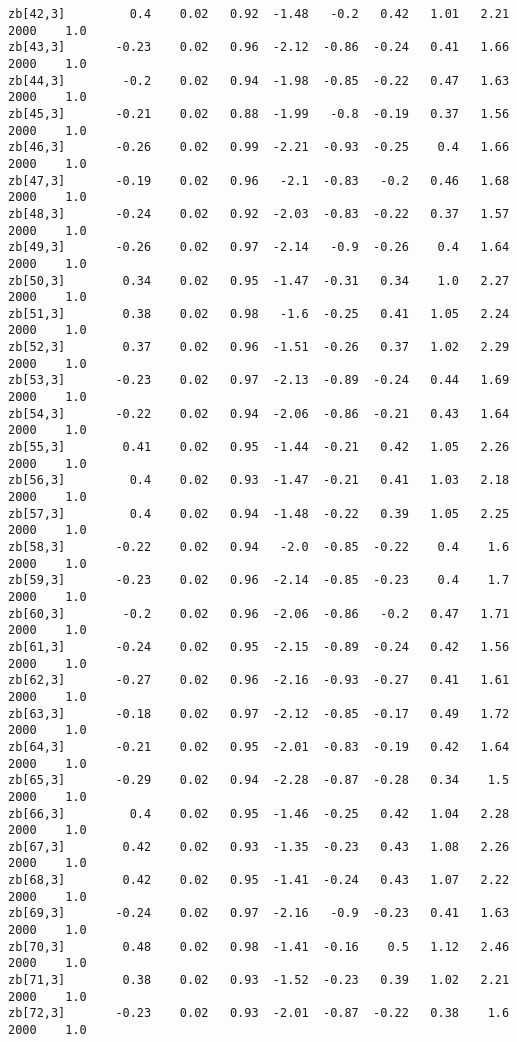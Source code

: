 \documentclass[11pt]{article}
\begin{document}
\begin{Verbatim}[commandchars=\\\{\}]
zb[42,3]         0.4    0.02   0.92  -1.48   -0.2   0.42   1.01   2.21   2000    1.0
zb[43,3]       -0.23    0.02   0.96  -2.12  -0.86  -0.24   0.41   1.66   2000    1.0
zb[44,3]        -0.2    0.02   0.94  -1.98  -0.85  -0.22   0.47   1.63   2000    1.0
zb[45,3]       -0.21    0.02   0.88  -1.99   -0.8  -0.19   0.37   1.56   2000    1.0
zb[46,3]       -0.26    0.02   0.99  -2.21  -0.93  -0.25    0.4   1.66   2000    1.0
zb[47,3]       -0.19    0.02   0.96   -2.1  -0.83   -0.2   0.46   1.68   2000    1.0
zb[48,3]       -0.24    0.02   0.92  -2.03  -0.83  -0.22   0.37   1.57   2000    1.0
zb[49,3]       -0.26    0.02   0.97  -2.14   -0.9  -0.26    0.4   1.64   2000    1.0
zb[50,3]        0.34    0.02   0.95  -1.47  -0.31   0.34    1.0   2.27   2000    1.0
zb[51,3]        0.38    0.02   0.98   -1.6  -0.25   0.41   1.05   2.24   2000    1.0
zb[52,3]        0.37    0.02   0.96  -1.51  -0.26   0.37   1.02   2.29   2000    1.0
zb[53,3]       -0.23    0.02   0.97  -2.13  -0.89  -0.24   0.44   1.69   2000    1.0
zb[54,3]       -0.22    0.02   0.94  -2.06  -0.86  -0.21   0.43   1.64   2000    1.0
zb[55,3]        0.41    0.02   0.95  -1.44  -0.21   0.42   1.05   2.26   2000    1.0
zb[56,3]         0.4    0.02   0.93  -1.47  -0.21   0.41   1.03   2.18   2000    1.0
zb[57,3]         0.4    0.02   0.94  -1.48  -0.22   0.39   1.05   2.25   2000    1.0
zb[58,3]       -0.22    0.02   0.94   -2.0  -0.85  -0.22    0.4    1.6   2000    1.0
zb[59,3]       -0.23    0.02   0.96  -2.14  -0.85  -0.23    0.4    1.7   2000    1.0
zb[60,3]        -0.2    0.02   0.96  -2.06  -0.86   -0.2   0.47   1.71   2000    1.0
zb[61,3]       -0.24    0.02   0.95  -2.15  -0.89  -0.24   0.42   1.56   2000    1.0
zb[62,3]       -0.27    0.02   0.96  -2.16  -0.93  -0.27   0.41   1.61   2000    1.0
zb[63,3]       -0.18    0.02   0.97  -2.12  -0.85  -0.17   0.49   1.72   2000    1.0
zb[64,3]       -0.21    0.02   0.95  -2.01  -0.83  -0.19   0.42   1.64   2000    1.0
zb[65,3]       -0.29    0.02   0.94  -2.28  -0.87  -0.28   0.34    1.5   2000    1.0
zb[66,3]         0.4    0.02   0.95  -1.46  -0.25   0.42   1.04   2.28   2000    1.0
zb[67,3]        0.42    0.02   0.93  -1.35  -0.23   0.43   1.08   2.26   2000    1.0
zb[68,3]        0.42    0.02   0.95  -1.41  -0.24   0.43   1.07   2.22   2000    1.0
zb[69,3]       -0.24    0.02   0.97  -2.16   -0.9  -0.23   0.41   1.63   2000    1.0
zb[70,3]        0.48    0.02   0.98  -1.41  -0.16    0.5   1.12   2.46   2000    1.0
zb[71,3]        0.38    0.02   0.93  -1.52  -0.23   0.39   1.02   2.21   2000    1.0
zb[72,3]       -0.23    0.02   0.93  -2.01  -0.87  -0.22   0.38    1.6   2000    1.0

\end{Verbatim}
\end{document}
